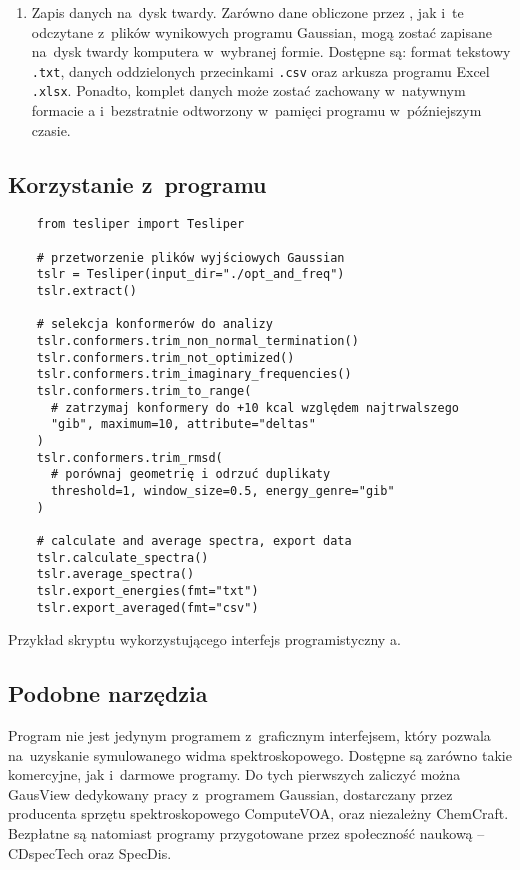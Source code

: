 \begin{enumerate}
  \item Zapis danych na~dysk twardy.
    Zarówno dane obliczone przez \tesliper{}, jak i~te odczytane z~plików wynikowych programu
      Gaussian, mogą zostać zapisane na~dysk twardy komputera w~wybranej formie.
    Dostępne są: format tekstowy \texttt{.txt}, danych oddzielonych przecinkami \texttt{.csv}
      oraz arkusza programu Excel \texttt{.xlsx}.
    Ponadto, komplet danych może zostać zachowany w~natywnym formacie \tesliper{}a
      i~bezstratnie odtworzony w~pamięci programu w~późniejszym czasie.
  
\end{enumerate}

\subsection{Korzystanie z~programu}\label{essence:use}

\begin{listing}
  \begin{lstlisting}
    from tesliper import Tesliper
    
    # przetworzenie plików wyjściowych Gaussian
    tslr = Tesliper(input_dir="./opt_and_freq")
    tslr.extract()
    
    # selekcja konformerów do analizy
    tslr.conformers.trim_non_normal_termination()
    tslr.conformers.trim_not_optimized()
    tslr.conformers.trim_imaginary_frequencies()
    tslr.conformers.trim_to_range(
      # zatrzymaj konformery do +10 kcal względem najtrwalszego
      "gib", maximum=10, attribute="deltas"
    )
    tslr.conformers.trim_rmsd(
      # porównaj geometrię i odrzuć duplikaty
      threshold=1, window_size=0.5, energy_genre="gib"
    )
    
    # calculate and average spectra, export data
    tslr.calculate_spectra()
    tslr.average_spectra()
    tslr.export_energies(fmt="txt")
    tslr.export_averaged(fmt="csv")
  \end{lstlisting}
  \caption{Przykład skryptu wykorzystującego interfejs programistyczny \tesliper{}a.}
  \label{lst:demo}    
\end{listing}

\subsection{Podobne narzędzia}\label{essence:simmilar}
Program \tesliper{} nie jest jedynym programem z~graficznym interfejsem, który pozwala
  na~uzyskanie symulowanego widma spektroskopowego.
Dostępne są zarówno takie komercyjne, jak i~darmowe programy.
Do tych pierwszych zaliczyć można GausView dedykowany pracy z~programem
  Gaussian, dostarczany przez producenta sprzętu spektroskopowego ComputeVOA,
  oraz niezależny ChemCraft.
Bezpłatne są natomiast programy przygotowane przez społeczność naukową \---
  CDspecTech oraz SpecDis.

